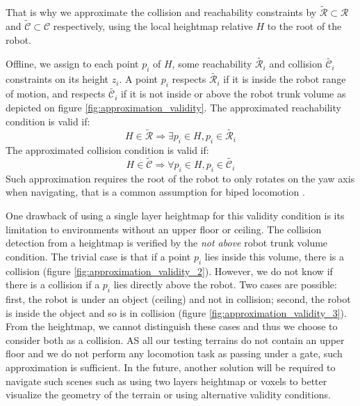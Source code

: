 That is why we approximate the collision and reachability constraints by $\tilde{\mathcal{R}} \subset \mathcal{R}$ and $\tilde{\mathcal{C}} \subset \mathcal{C}$ respectively, using the local heightmap relative $H$ to the root of the robot.

Offline, we assign to each point $p_i$ of $H$, some reachability $\tilde{\mathcal{R}_i}$ and collision $\tilde{\mathcal{C}_i}$ constraints on its height $z_i$. 
A point $p_i$ respects $\tilde{\mathcal{R}_i}$ if it is inside the robot range of motion, and respects $\tilde{\mathcal{C}_i}$ if it is not inside or above the robot trunk volume as depicted on figure \ref{fig:approximation_validity}. 
The approximated reachability condition is valid if:
\begin{equation}
    H \in \tilde{\mathcal{R}} \Rightarrow \exists p_i \in H, p_i \in \tilde{\mathcal{R}_i}
\end{equation}
The approximated collision condition is valid if:
\begin{equation}
    H \in \tilde{\mathcal{C}} \Rightarrow \forall p_i \in H, p_i \in \tilde{\mathcal{C}_i}
\end{equation}
Such approximation requires the root of the robot to only rotates on the yaw axis when navigating, that is a common assumption for biped locomotion \cite{CP_MIP_DEITS}.

One drawback of using a single layer heightmap for this validity condition is its limitation to environments without an upper floor or ceiling.
The collision detection from a heightmap is verified by the \textit{not above} robot trunk volume condition. 
The trivial case is that if a point $p_i$ lies inside this volume, there is a collision (figure \ref{fig:approximation_validity_2}). However, we do not know if there is a collision if a $p_i$ lies directly above the robot. 
Two cases are possible: first, the robot is under an object (ceiling) and not in collision; second, the robot is inside the object and so is in collision (figure \ref{fig:approximation_validity_3}).
From the heightmap, we cannot distinguish these cases and thus we choose to consider both as a collision.
AS all our testing terrains do not contain an upper floor and we do not perform any locomotion task as passing under a gate, such approximation is sufficient. 
In the future, another solution will be required to navigate such scenes such as using two layers heightmap or voxels to better visualize the geometry of the terrain or using alternative validity conditions.

